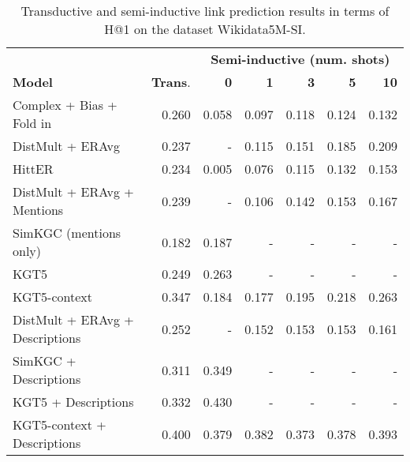 \documentclass[11pt]{article}
\renewcommand\:{\colon} \newcommand{\sset}[1]{\left\{\,#1\,\right\}} \newcommand{\ssets}[1]{\left\{#1\right\}} \newcommand{\ssetn}[1]{\{\,#1\,\}}
\begin{document}
\begin{table*}
  \centering
  \begin{tabular}{lrrrrrr}
    \toprule
    & & \multicolumn{5}{c}{\textbf{Semi-inductive (num. shots)}}\\
    \cmidrule{3-7}
    \textbf{Model} & \textbf{Trans}. & \textbf{0} & \textbf{1} & \textbf{3} & \textbf{5} & \textbf{10} \\
    \midrule
    Complex + Bias + Fold in~\cite{jambor2021exploring} & 0.260 & 0.058 & 0.097 & 0.118 & 0.124 & 0.132 \\ DistMult + ERAvg~\cite{albooyeh2020out} & 0.237 & - & 0.115 & 0.151 & 0.185 & 0.209 \\ HittER~\cite{chen2021hitter} & 0.234 & 0.005 & 0.076 & 0.115 & 0.132 & 0.153 \\ \midrule
    DistMult + ERAvg + Mentions & 0.239 & - & 0.106 & 0.142 & 0.153 & 0.167 \\ SimKGC (mentions only) & 0.182 & 0.187 & - & - & - & -\\
    KGT5~\cite{saxena2022sequence} & 0.249 & 0.263 & - & - & - & -\\ KGT5-context~\cite{kochsiek2023friendly} & 0.347 & 0.184 & 0.177 & 0.195 & 0.218 & 0.263  \\ \midrule
    DistMult + ERAvg + Descriptions & 0.252 & - & 0.152 & 0.153 & 0.153 & 0.161 \\ SimKGC + Descriptions~\cite{wang2022simkgc} & 0.311 & 0.349 & - & - & - & -\\
    KGT5 + Descriptions & 0.332 & 0.430 & - & - & - & - \\ KGT5-context + Descriptions & 0.400 & 0.379 & 0.382 & 0.373 & 0.378 & 0.393 \\ \bottomrule
  \end{tabular}
  \caption{Transductive and semi-inductive link prediction results in terms of H@1 on the dataset Wikidata5M-SI.}
  \label{tab:si_results_h1}
\end{table*}
\end{document}
